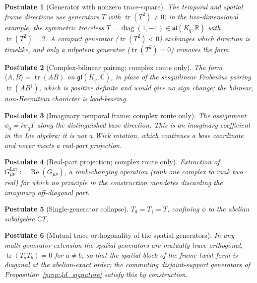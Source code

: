 \documentclass[11pt]{article}
\newtheorem{postulate}{Postulate}
\begin{document}
\renewcommand{\thepostulate}{P4.\arabic{postulate}}
\begin{postulate}[Generator with nonzero trace-square]\label{post:noncompact}
The temporal and spatial frame directions use generators $T$ with $\operatorname{tr}(T^2) \neq 0$; in the two-dimensional example, the symmetric traceless $T = \operatorname{diag}(1,-1) \in \mathfrak{sl}(K_q,\mathbb{R})$ with $\operatorname{tr}(T^2) = 2$. A compact generator ($\operatorname{tr}(T^2) < 0$) exchanges which direction is timelike, and only a nilpotent generator ($\operatorname{tr}(T^2) = 0$) removes the form.
\end{postulate}
\begin{postulate}[Complex-bilinear pairing; complex route only]\label{post:pairing}
The form $\langle A, B\rangle = \operatorname{tr}(AB)$ on $\mathfrak{gl}(K_q,\mathbb{C})$, in place of the sesquilinear Frobenius pairing $\operatorname{tr}(AB^\dagger)$, which is positive definite and would give no sign change; the bilinear, non-Hermitian character is load-bearing.
\end{postulate}
\begin{postulate}[Imaginary temporal frame; complex route only]\label{post:imaginary}
The assignment $\phi_0 = i\psi_0 T$ along the distinguished base direction. This is an imaginary coefficient in the Lie algebra; it is not a Wick rotation, which continues a base coordinate and never meets a real-part projection.
\end{postulate}
\begin{postulate}[Real-part projection; complex route only]\label{post:realpart}
Extraction of $G^{\mathrm{Lor}}_{\mu\nu} := \operatorname{Re}(G_{\mu\nu})$, a rank-changing operation (rank one complex to rank two real) for which no principle in the construction mandates discarding the imaginary off-diagonal part.
\end{postulate}
\begin{postulate}[Single-generator collapse]\label{post:collapse}
$T_0 = T_1 = T$, confining $\phi$ to the abelian subalgebra $\mathbb{C}T$.
\end{postulate}
\begin{postulate}[Mutual trace-orthogonality of the spatial generators]\label{post:traceorth}
In any multi-generator extension the spatial generators are mutually trace-orthogonal, $\operatorname{tr}(T_a T_b) = 0$ for $a \neq b$, so that the spatial block of the frame-twist form is diagonal at the abelian-exact order; the commuting disjoint-support generators of Proposition~\ref{prop:4d_signature} satisfy this by construction.
\end{postulate}
\end{document}
